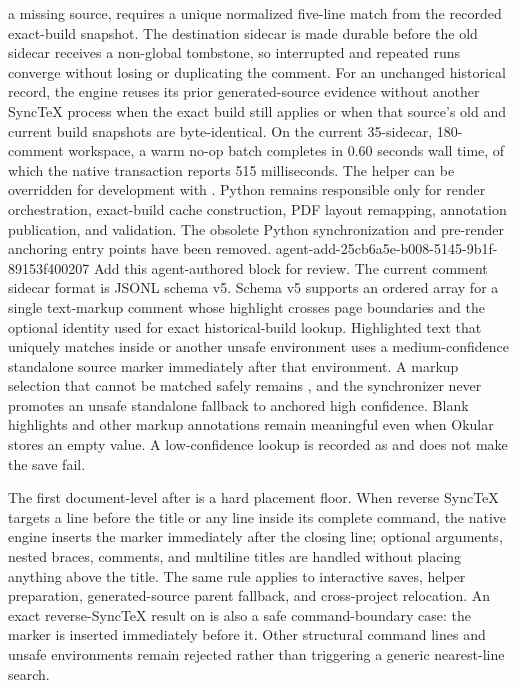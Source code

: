 a missing source, requires a unique normalized five-line match from the
recorded exact-build snapshot.
The destination sidecar is made durable before the old sidecar receives a
non-global  tombstone, so interrupted and repeated runs
converge without losing or duplicating the comment.
For an unchanged historical record, the engine reuses its prior generated-source evidence without another SyncTeX process when the exact build still applies or when that source's old and current build snapshots are byte-identical.
On the current 35-sidecar, 180-comment workspace, a warm no-op batch completes in 0.60 seconds wall time, of which the native transaction reports 515 milliseconds.
The helper can be overridden for development with .
Python remains responsible only for render orchestration, exact-build cache construction, PDF layout remapping, annotation publication, and validation.
The obsolete Python synchronization and pre-render anchoring entry points have been removed.
\agentProposedEdit
  {agent-add-25cb6a5e-b008-5145-9b1f-89153f400207}
  {Add this agent-authored block for review.}
  {}
  {The current comment sidecar format is JSONL schema v5.
Schema v5 supports an ordered  array for a single text-markup comment whose highlight crosses page boundaries and the optional  identity used for exact historical-build lookup.
Highlighted text that uniquely matches inside  or another unsafe environment uses a medium-confidence standalone source marker immediately after that environment.
A markup selection that cannot be matched safely remains , and the synchronizer never promotes an unsafe standalone fallback to anchored high confidence.}
Blank highlights and other markup annotations remain meaningful even when Okular stores an empty  value.
A low-confidence lookup is recorded as  and does not make the save fail.

The first document-level \code{\docTitle} after
 is a hard placement floor.
When reverse SyncTeX targets a line before the title or any line inside its
complete command, the native engine inserts the marker immediately after the
closing line; optional arguments, nested braces, comments, and multiline
titles are handled without placing anything above the title.
The same rule applies to interactive saves, helper preparation,
generated-source parent fallback, and cross-project relocation.
An exact reverse-SyncTeX result on  is
also a safe command-boundary case: the marker is inserted immediately before
it.
Other structural command lines and unsafe environments remain rejected rather
than triggering a generic nearest-line search.

